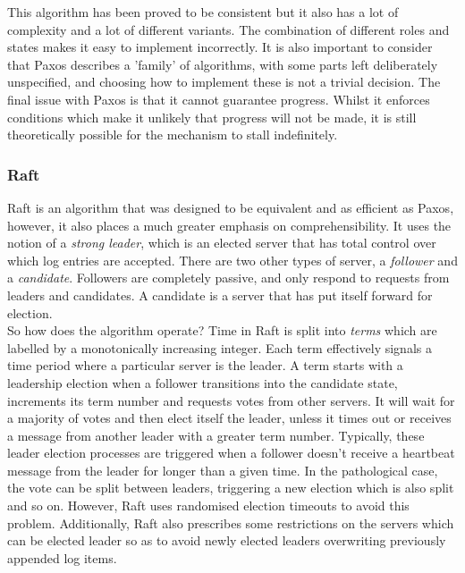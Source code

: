 \documentclass[12pt,a4paper,twoside,openright]{report}
\begin{document}
			This algorithm has been proved to be consistent but it also has a lot of complexity and a lot of different variants. 
			The combination of different roles and states makes it easy to implement incorrectly.
			It is also important to consider that Paxos describes a 'family' of algorithms, with some parts left deliberately unspecified, and choosing how to implement these is not a trivial decision.
			The final issue with Paxos is that it cannot guarantee progress.
			Whilst it enforces conditions which make it unlikely that progress will not be made, it is still theoretically possible for the mechanism to stall indefinitely.

			\subsubsection*{Raft}
			Raft \cite{Raft} is an algorithm that was designed to be equivalent and as efficient as Paxos, however, it also places a much greater emphasis on comprehensibility.
			It uses the notion of a \textit{strong leader}, which is an elected server that has total control over which log entries are accepted.
			There are two other types of server, a \textit{follower} and a \textit{candidate}. 
			Followers are completely passive, and only respond to requests from leaders and candidates. 
			A candidate is a server that has put itself forward for election.\\

			So how does the algorithm operate? 
			Time in Raft is split into \textit{terms} which are labelled by a monotonically increasing integer. 
			Each term effectively signals a time period where a particular server is the leader. 
			A term starts with a leadership election when a follower transitions into the candidate state, increments its term number and requests votes from other servers. 
			It will wait for a majority of votes and then elect itself the leader, unless it times out or receives a message from another leader with a greater term number. 
			Typically, these leader election processes are triggered when a follower doesn't receive a heartbeat message from the leader for longer than a given time.
			In the pathological case, the vote can be split between leaders, triggering a new election which is also split and so on.
			However, Raft uses randomised election timeouts to avoid this problem.
			Additionally, Raft also prescribes some restrictions on the servers which can be elected leader so as to avoid newly elected leaders overwriting previously appended log items.\\
			
\end{document}
